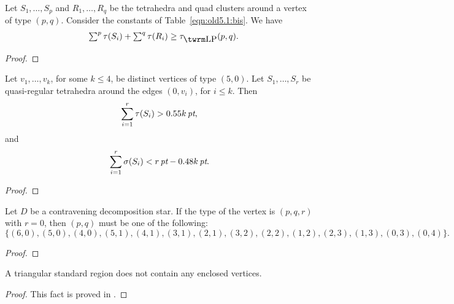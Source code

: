 \begin{lemma} \label{lemma:pq:bis} %
Let $S_1,\ldots,S_p$ and $R_1,\ldots,R_q$ be the tetrahedra and
quad clusters around a vertex of type $(p,q)$. Consider the
constants of Table~\ref{eqn:old5.1:bis}.  We have
    $$
    \begin{array}{lll}
    &\sum^p\tau(S_i) + \sum^q\tau(R_i) \ge \tlp(p,q).\\
    \end{array}
    $$
\end{lemma}

\begin{proof} 
\end{proof}

\begin{lemma} \label{lemma:0.55:bis} %
Let $v_1,\ldots, v_k$, for some $k\le 4$, be distinct vertices of
type $(5,0)$.  Let $S_1,\ldots, S_r$ be quasi-regular tetrahedra
around the edges $(0,v_i)$, for $i\le k$. Then
    $$
    \sum_{i=1}^r \tau(S_i)> 0.55k\,\hbox{\it pt},
    $$
and
    $$\sum_{i=1}^r \sigma(S_i) < r\,\hbox{\it pt} - 0.48k\,\hbox{\it pt}.$$
\end{lemma}

\begin{proof} 
\end{proof}

\begin{lemma}\label{lemma:pq-types:bis} %
Let $D$ be a contravening decomposition star.  If the type of the
vertex is $(p,q,r)$ with $r=0$, then $(p,q)$ must be one of the
following:
    $$\{
        (6,0),(5,0),(4,0),
        (5,1),(4,1),(3,1),(2,1),
        (3,2),(2,2),(1,2),
        (2,3),(1,3),(0,3),(0,4)\}.$$
\end{lemma}

\begin{proof} 
\end{proof}

\begin{lemma}
        \label{lemma:no-enclosed-tri:bis}
        A triangular standard region does not contain any enclosed
        vertices.
\end{lemma}

\begin{proof}
    This fact is proved in \cite[Lemma~3.7]{part1}.
\end{proof}

